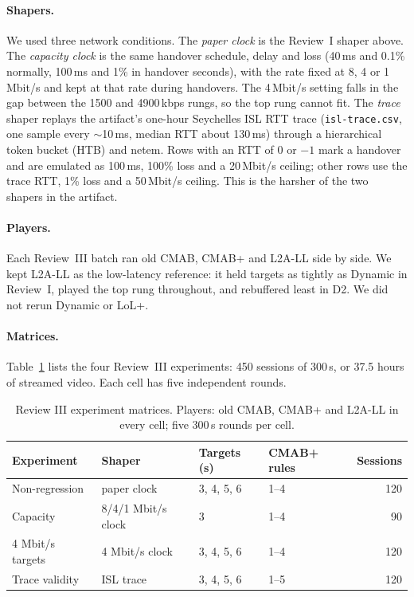 \documentclass[sigconf]{acmart}
\newcommand{\cmabp}{CMAB+\xspace}
\newcommand{\oldcmab}{old CMAB\xspace}
\newcommand{\kbps}{\,kbps\xspace}
\begin{document}
\paragraph{Shapers.} We used three network conditions. The \emph{paper clock} is the Review~I shaper above. The \emph{capacity clock} is the same handover schedule, delay and loss (40\,ms and 0.1\% normally, 100\,ms and 1\% in handover seconds), with the rate fixed at 8, 4 or 1\,Mbit/s and kept at that rate during handovers. The 4\,Mbit/s setting falls in the gap between the 1500 and 4900\kbps rungs, so the top rung cannot fit. The \emph{trace} shaper replays the artifact's one-hour Seychelles ISL RTT trace (\texttt{isl-trace.csv}, one sample every $\sim$10\,ms, median RTT about 130\,ms) through a hierarchical token bucket (HTB) and netem. Rows with an RTT of 0 or $-1$ mark a handover and are emulated as 100\,ms, 100\% loss and a 20\,Mbit/s ceiling; other rows use the trace RTT, 1\% loss and a 50\,Mbit/s ceiling. This is the harsher of the two shapers in the artifact.

\paragraph{Players.} Each Review~III batch ran \oldcmab, \cmabp and L2A-LL side by side. We kept L2A-LL as the low-latency reference: it held targets as tightly as Dynamic in Review~I, played the top rung throughout, and rebuffered least in D2. We did not rerun Dynamic or LoL+.

\paragraph{Matrices.} Table~\ref{tab:matrix} lists the four Review~III experiments: 450 sessions of 300\,s, or 37.5 hours of streamed video. Each cell has five independent rounds.

\begin{table}[t]
\caption{Review III experiment matrices. Players: old CMAB, CMAB+ and L2A-LL in every cell; five 300\,s rounds per cell.}
\label{tab:matrix}
\footnotesize
\begin{tabular}{@{}llllr@{}}
\toprule
Experiment & Shaper & Targets (s) & CMAB+ rules & Sessions \\
\midrule
Non-regression & paper clock & 3, 4, 5, 6 & 1--4 & 120 \\
Capacity & 8/4/1 Mbit/s clock & 3 & 1--4 & 90 \\
4 Mbit/s targets & 4 Mbit/s clock & 3, 4, 5, 6 & 1--4 & 120 \\
Trace validity & ISL trace & 3, 4, 5, 6 & 1--5 & 120 \\
\bottomrule
\end{tabular}
\end{table}
\end{document}
